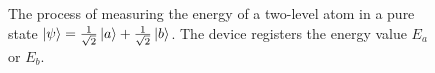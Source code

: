 \begin{figure}
\centering



\caption{The process of measuring the energy of a two-level atom in a pure state $\left|\psi\right> = 
\frac{1}{\sqrt{2}}\ket{a} + \frac{1}{\sqrt{2}}\ket{b}$.
The device registers the energy value $E_a$ or $E_b$.
}
\label{fig:add:mesure_ex}
\end{figure}

